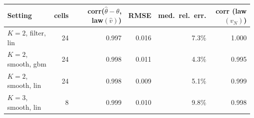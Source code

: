 \begin{tabular}{lrrrrr}
\toprule
Setting & cells & corr($\hat\theta{-}\theta$, law$(\hat v)$) & RMSE & med.\ rel.\ err. & corr (law$(v_N)$) \\
\midrule
$K{=}2$, filter, lin & 24 & 0.997 & 0.016 & 7.3\% & 1.000 \\
$K{=}2$, smooth, gbm & 24 & 0.998 & 0.011 & 4.3\% & 0.995 \\
$K{=}2$, smooth, lin & 24 & 0.998 & 0.009 & 5.1\% & 0.999 \\
$K{=}3$, smooth, lin & 8 & 0.999 & 0.010 & 9.8\% & 0.998 \\
\bottomrule
\end{tabular}